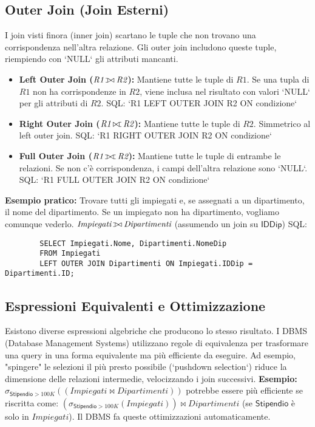 \documentclass{article}
\newcommand{\Rel}[1]{\textit{#1}} %
\newcommand{\Attr}[1]{\textsf{#1}} %
\newcommand{\myselectop}[2]{\sigma_{#1}(#2)}
\newcommand{\mynaturaljoin}{\bowtie} %
\def\ojoin{\setbox0=\hbox{$\mynaturaljoin$}%
	\rule[-.02ex]{.25em}{.4pt}\llap{\rule[\ht0]{.25em}{.4pt}}}
\newcommand{\myleftouterjoin}{\mathbin{\ojoin\mkern-5.8mu\mynaturaljoin}}
\newcommand{\myrightouterjoin}{\mathbin{\mynaturaljoin\mkern-5.8mu\ojoin}}
\newcommand{\myfullouterjoin}{\mathbin{\ojoin\mkern-5.8mu\mynaturaljoin\mkern-5.8mu\ojoin}}
\begin{document}
	\subsection{Outer Join (Join Esterni)}
	I join visti finora (inner join) scartano le tuple che non trovano una corrispondenza nell'altra relazione. Gli outer join includono queste tuple, riempiendo con `NULL` gli attributi mancanti.
	\begin{itemize}
		\item \textbf{Left Outer Join ($\Rel{R1} \myleftouterjoin \Rel{R2}$):} Mantiene tutte le tuple di $\Rel{R1}$. Se una tupla di $\Rel{R1}$ non ha corrispondenze in $\Rel{R2}$, viene inclusa nel risultato con valori `NULL` per gli attributi di $\Rel{R2}$.
		SQL: `R1 LEFT OUTER JOIN R2 ON condizione`
		\item \textbf{Right Outer Join ($\Rel{R1} \myrightouterjoin \Rel{R2}$):} Mantiene tutte le tuple di $\Rel{R2}$. Simmetrico al left outer join.
		SQL: `R1 RIGHT OUTER JOIN R2 ON condizione`
		\item \textbf{Full Outer Join ($\Rel{R1} \myfullouterjoin \Rel{R2}$):} Mantiene tutte le tuple di entrambe le relazioni. Se non c'è corrispondenza, i campi dell'altra relazione sono `NULL`.
		SQL: `R1 FULL OUTER JOIN R2 ON condizione`
	\end{itemize}
	\textbf{Esempio pratico:} Trovare tutti gli impiegati e, se assegnati a un dipartimento, il nome del dipartimento. Se un impiegato non ha dipartimento, vogliamo comunque vederlo.
	$\Rel{Impiegati} \myleftouterjoin \Rel{Dipartimenti}$ (assumendo un join su $\Attr{IDDip}$)
	SQL:
	\begin{verbatim}
		SELECT Impiegati.Nome, Dipartimenti.NomeDip
		FROM Impiegati
		LEFT OUTER JOIN Dipartimenti ON Impiegati.IDDip = Dipartimenti.ID;
	\end{verbatim}
	
	\subsection{Espressioni Equivalenti e Ottimizzazione}
	Esistono diverse espressioni algebriche che producono lo stesso risultato. I DBMS (Database Management Systems) utilizzano regole di equivalenza per trasformare una query in una forma equivalente ma più efficiente da eseguire.
	Ad esempio, "spingere" le selezioni il più presto possibile (`pushdown selection`) riduce la dimensione delle relazioni intermedie, velocizzando i join successivi.
	\textbf{Esempio:}
	$\myselectop{\Attr{Stipendio}>100K}{(\Rel{Impiegati} \mynaturaljoin \Rel{Dipartimenti})}$
	potrebbe essere più efficiente se riscritta come:
	$(\myselectop{\Attr{Stipendio}>100K}{\Rel{Impiegati}}) \mynaturaljoin \Rel{Dipartimenti}$
	(se $\Attr{Stipendio}$ è solo in $\Rel{Impiegati}$). Il DBMS fa queste ottimizzazioni automaticamente.
	
\end{document}
